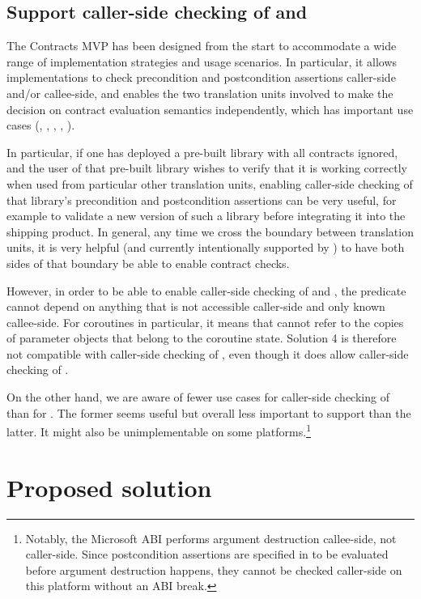 \subsection{Support caller-side checking of  and }

The Contracts MVP has been designed from the start to accommodate a wide range of implementation strategies and usage scenarios. In particular, it allows implementations to check precondition and postcondition assertions caller-side and/or callee-side, and enables the two translation units involved to make the decision on contract evaluation semantics independently, which has important use cases (\cite{P2751R1}, \cite{P3228R1}, \cite{P3119R1}, \cite{P3267R1}, \cite{P3321R0}).

In particular, if one has deployed a pre-built library with all contracts ignored, and the user of that pre-built library wishes to verify that it is working correctly when used from particular other translation units, enabling caller-side checking of that library's precondition and postcondition assertions can be very useful, for example to validate a new version of such a library before integrating it into the shipping product. In general, any time we cross the boundary between translation units, it is very helpful (and currently intentionally supported by \cite{P2900R8}) to have both sides of that boundary be able to enable contract checks.

However, in order to be able to enable caller-side checking of  and , the predicate cannot depend on anything that is not accessible caller-side and only known callee-side. For coroutines in particular, it means that  cannot refer to the copies of parameter objects that belong to the coroutine state. Solution 4 is therefore not compatible with caller-side checking of , even though it does allow caller-side checking of .

On the other hand, we are aware of fewer use cases for caller-side checking of  than for . The former seems useful but overall less important to support than the latter. It might also be unimplementable on some platforms.\footnote{Notably, the Microsoft ABI performs argument destruction callee-side, not caller-side. Since postcondition assertions are specified in \cite{P2900R8} to be evaluated before argument destruction happens, they cannot be checked caller-side on this platform without an ABI break.}

\section{Proposed solution}

